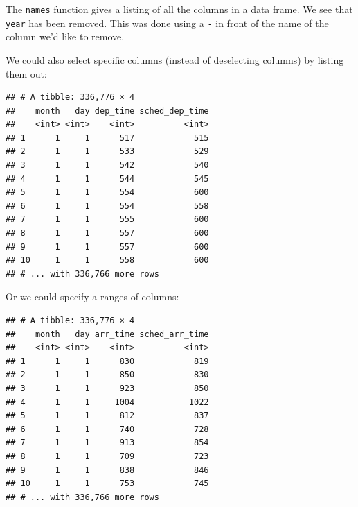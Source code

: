 \documentclass[]{tufte-book}
\newenvironment{Shaded}{\begin{snugshade}}{\end{snugshade}}
\newcommand{\KeywordTok}[1]{\textcolor[rgb]{0.13,0.29,0.53}{\textbf{{#1}}}}
\newcommand{\StringTok}[1]{\textcolor[rgb]{0.31,0.60,0.02}{{#1}}}
\newcommand{\NormalTok}[1]{{#1}}
\begin{document}
The \texttt{names} function gives a listing of all the columns in a data
frame. We see that \texttt{year} has been removed. This was done using a
\texttt{-} in front of the name of the column we'd like to remove.

We could also select specific columns (instead of deselecting columns)
by listing them out:

\begin{Shaded}
\end{Shaded}

\begin{verbatim}
## # A tibble: 336,776 × 4
##    month   day dep_time sched_dep_time
##    <int> <int>    <int>          <int>
## 1      1     1      517            515
## 2      1     1      533            529
## 3      1     1      542            540
## 4      1     1      544            545
## 5      1     1      554            600
## 6      1     1      554            558
## 7      1     1      555            600
## 8      1     1      557            600
## 9      1     1      557            600
## 10     1     1      558            600
## # ... with 336,766 more rows
\end{verbatim}

Or we could specify a ranges of columns:

\begin{Shaded}
\end{Shaded}

\begin{verbatim}
## # A tibble: 336,776 × 4
##    month   day arr_time sched_arr_time
##    <int> <int>    <int>          <int>
## 1      1     1      830            819
## 2      1     1      850            830
## 3      1     1      923            850
## 4      1     1     1004           1022
## 5      1     1      812            837
## 6      1     1      740            728
## 7      1     1      913            854
## 8      1     1      709            723
## 9      1     1      838            846
## 10     1     1      753            745
## # ... with 336,766 more rows
\end{verbatim}
\end{document}
